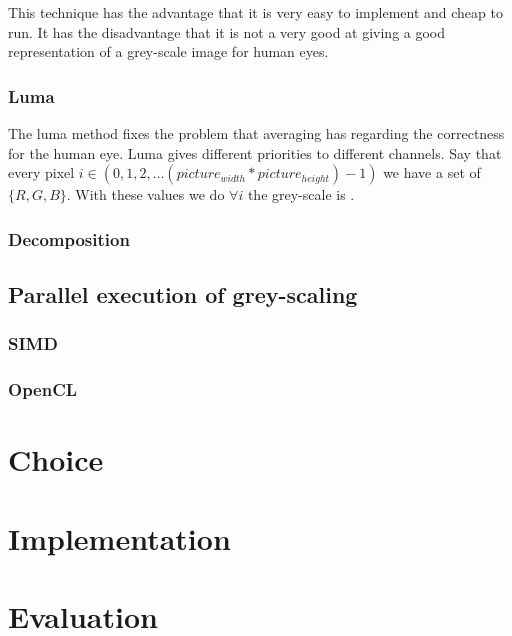 \documentclass[a4paper]{article}
\begin{document}
This technique has the advantage that it is very easy to implement and cheap to run. It has the disadvantage that it is not a very good at giving a good representation of a grey-scale image for human eyes.
\subsubsection{Luma}
The luma method fixes the problem that averaging has regarding the correctness for the human eye. Luma gives different priorities to different channels. Say that every pixel \(i \in \left( 0, 1, 2, \dotsc \left( picture_{width} * picture_{height} \right) - 1 \right) \) we have a set of \(\{ R, G, B\}\).
With these values we do \( \forall i \) the grey-scale is \(  \).

\subsubsection{Decomposition}

\subsection{Parallel execution of grey-scaling}
\subsubsection{SIMD}

\subsubsection{OpenCL}

\section{Choice}

\section{Implementation}

\section{Evaluation}
\end{document}
